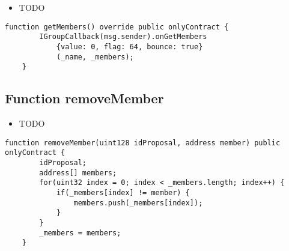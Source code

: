 \begin{itemize}
\item TODO
\end{itemize}

\begin{lstlisting}[firstnumber=19]
    function getMembers() override public onlyContract {
        IGroupCallback(msg.sender).onGetMembers
            {value: 0, flag: 64, bounce: true}
            (_name, _members);
    }
\end{lstlisting}

\subsection{Function removeMember}

\begin{itemize}
\item TODO
\end{itemize}

\begin{lstlisting}[firstnumber=30]
    function removeMember(uint128 idProposal, address member) public onlyContract {
        idProposal;
        address[] members;
        for(uint32 index = 0; index < _members.length; index++) {
            if(_members[index] != member) {
                members.push(_members[index]);
            }
        }
        _members = members;
    }
\end{lstlisting}
